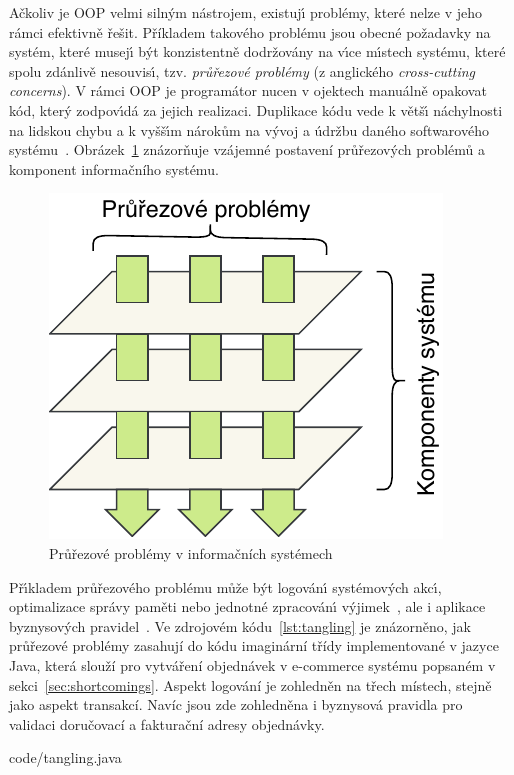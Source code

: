 Ačkoliv je \gls{OOP} velmi siln\'ym nástrojem, existuj\'{\i} problémy,
které nelze v jeho rámci efektivně řešit.
Příkladem takového problému jsou obecné požadavky na systém,
které musej\'{\i} b\'yt konzistentně dodržovány na v\'{\i}ce
m\'{\i}stech systému, které spolu zdánlivě nesouvis\'{\i},
tzv. \textit{průřezové problémy} (z anglického \textit{cross-cutting concerns}).
V rámci \gls{OOP} je programátor nucen v ojektech manuálně opakovat
kód, kter\'y zodpov\'{\i}dá za jejich realizaci. Duplikace kódu
vede k větš\'{\i} náchylnosti na lidskou chybu a k vyšš\'{\i}m nárokům na v\'yvoj
a údržbu daného softwarového systému~\cite{fowler1999refactoring}.
Obrázek~\ref{fig:cross-cutting} znázorňuje vzájemné postavení průřezových
problémů a komponent informačního systému.

\begin{figure}[t]
    \centering
    \includegraphics[keepaspectratio=true, width=0.35\linewidth]{figures/cross-cutting.pdf}
    \caption{Průřezové problémy v informačních systémech}
    \label{fig:cross-cutting}
\end{figure}

Př\'{\i}kladem průřezového problému může b\'yt logován\'{\i}
systémov\'ych akc\'{\i}, optimalizace správy paměti
nebo jednotné zpracován\'{\i} v\'yjimek~\cite{kiczales1997aspect},
ale i aplikace byznysových pravidel~\cite{cemus2014aspect}.
Ve zdrojovém kódu~\ref{lst:tangling} je znázorněno, jak průřezové
problémy zasahují do kódu imaginární třídy implementované v
jazyce Java, která slouží pro vytváření objednávek v e-commerce
systému popsaném v sekci~\ref{sec:shortcomings}.
Aspekt logování je zohledněn na třech místech, stejně jako aspekt transakcí.
Navíc jsou zde zohledněna i byznysová pravidla pro validaci doručovací
a fakturační adresy objednávky.


{code/tangling.java}

